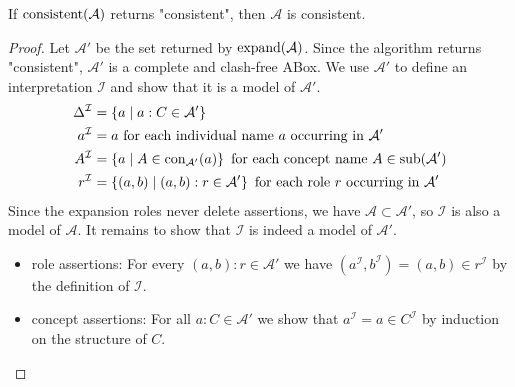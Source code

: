 \begin{lemma}[Soundness]
	If $\operatorname{\text{consistent}}(\mathcal{A})$ returns "consistent", then $\mathcal{A}$ is consistent.
\end{lemma}
\begin{proof}
	Let $\mathcal{A}'$ be the set returned by $\operatorname{\text{expand}}(\mathcal{A})$.
	Since the algorithm returns "consistent", $\mathcal{A}'$ is a complete and clash-free ABox.
	We use $\mathcal{A}'$ to define an interpretation $\mathcal{I}$ and show that it is a model of $\mathcal{A}'$.
	\begin{align*}
		\Delta^\mathcal{I} &= \left\{ a \mid a:C \in \mathcal{A}' \right\}\\
		a^\mathcal{I} &= a \text{ for each individual name $a$ occurring in $\mathcal{A}'$} \\
	A^\mathcal{I} &= \left\{ a \mid A \in \operatorname{\text{con}}_{\mathcal{A}'}(a) \right\} \text{ for each concept name } A \in \operatorname{\text{sub}}(\mathcal{A'}) \\
	r^\mathcal{I} &= \left\{ (a,b) \mid (a,b):r \in \mathcal{A}' \right\} \text{ for each role $r$ occurring in $\mathcal{A}'$}
	\end{align*}
	Since the expansion roles never delete assertions, we have $\mathcal{A} \subset \mathcal{A}'$, so $\mathcal{I}$ is also a model of $\mathcal{A}$.
	It remains to show that $\mathcal{I}$ is indeed a model of $\mathcal{A}'$.
	\begin{itemize}
		\item role assertions: For every $(a,b) : r \in \mathcal{A}'$ we have $(a^\mathcal{I},b^\mathcal{I}) = (a,b) \in r^\mathcal{I}$ by the definition of $\mathcal{I}$.
		\item concept assertions: For all $a : C \in \mathcal{A}'$ we show that $a^\mathcal{I} = a \in C^\mathcal{I}$ by induction on the structure of $C$.
	\end{itemize}
\end{proof}
